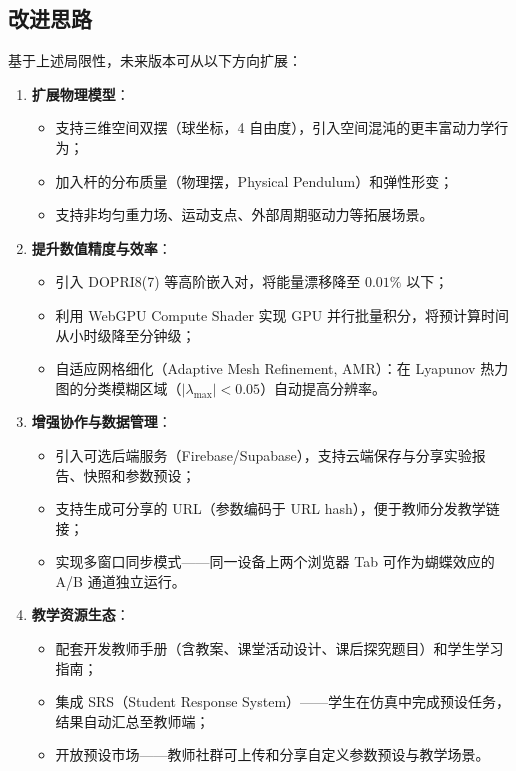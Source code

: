 \subsection{改进思路}

基于上述局限性，未来版本可从以下方向扩展：

\begin{enumerate}[label=(\arabic*), leftmargin=*]
  \item \textbf{扩展物理模型}：
        \begin{itemize}
          \item 支持三维空间双摆（球坐标，4 自由度），引入空间混沌的更丰富动力学行为；
          \item 加入杆的分布质量（物理摆，Physical Pendulum）和弹性形变；
          \item 支持非均匀重力场、运动支点、外部周期驱动力等拓展场景。
        \end{itemize}

  \item \textbf{提升数值精度与效率}：
        \begin{itemize}
          \item 引入 DOPRI8(7) 等高阶嵌入对，将能量漂移降至 $0.01\%$ 以下；
          \item 利用 WebGPU Compute Shader 实现 GPU 并行批量积分，将预计算时间从小时级降至分钟级；
          \item 自适应网格细化（Adaptive Mesh Refinement, AMR）：在 Lyapunov 热力图的分类模糊区域（$|\lambda_{\max}| < 0.05$）自动提高分辨率。
        \end{itemize}

  \item \textbf{增强协作与数据管理}：
        \begin{itemize}
          \item 引入可选后端服务（Firebase/Supabase），支持云端保存与分享实验报告、快照和参数预设；
          \item 支持生成可分享的 URL（参数编码于 URL hash），便于教师分发教学链接；
          \item 实现多窗口同步模式——同一设备上两个浏览器 Tab 可作为蝴蝶效应的 A/B 通道独立运行。
        \end{itemize}

  \item \textbf{教学资源生态}：
        \begin{itemize}
          \item 配套开发教师手册（含教案、课堂活动设计、课后探究题目）和学生学习指南；
          \item 集成 SRS（Student Response System）——学生在仿真中完成预设任务，结果自动汇总至教师端；
          \item 开放预设市场——教师社群可上传和分享自定义参数预设与教学场景。
        \end{itemize}


\end{enumerate}

